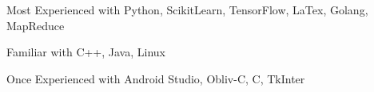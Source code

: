 

\begin{cvskills}

  \cvskill
    {Most Experienced with} %
    {Python, ScikitLearn, TensorFlow, LaTex, Golang, MapReduce} %

  \cvskill
    {Familiar with} %
    {C++, Java, Linux} %

  \cvskill
  	{Once Experienced with}
  	{Android Studio, Obliv-C, C, TkInter}
\end{cvskills}
